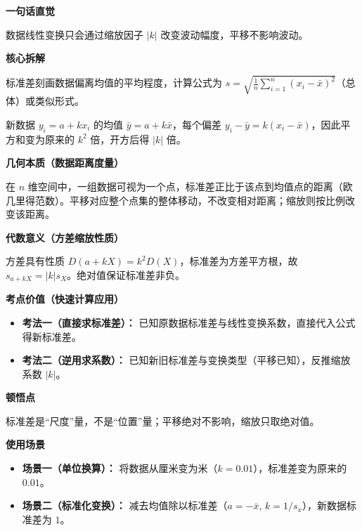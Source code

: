 \begin{explanationbox}

	\textbf{\textcolor{CExplanation}{一句话直觉}}

	数据线性变换只会通过缩放因子 $|k|$ 改变波动幅度，平移不影响波动。

	\medskip
	\textbf{\textcolor{CExplanation}{核心拆解}}
	\begin{description}[style=nextline, leftmargin=2.8em, labelsep=0.5em, itemsep=0.45em]
		\item[\textbf{要点一（标准差的定义）：}] 标准差刻画数据偏离均值的平均程度，计算公式为 $s = \sqrt{\frac{1}{n}\sum_{i=1}^n (x_i - \bar{x})^2}$（总体）或类似形式。
		\item[\textbf{要点二（线性变换效应）：}] 新数据 $y_i = a + kx_i$ 的均值 $\bar{y} = a + k\bar{x}$，每个偏差 $y_i - \bar{y} = k(x_i - \bar{x})$，因此平方和变为原来的 $k^2$ 倍，开方后得 $|k|$ 倍。
	\end{description}

	\medskip
	\textbf{\textcolor{CExplanation}{几何本质（数据距离度量）}}

	在 $n$ 维空间中，一组数据可视为一个点，标准差正比于该点到均值点的距离（欧几里得范数）。平移对应整个点集的整体移动，不改变相对距离；缩放则按比例改变该距离。

	\medskip
	\textbf{\textcolor{CExplanation}{代数意义（方差缩放性质）}}

	方差具有性质 $D(a + kX) = k^2 D(X)$，标准差为方差平方根，故 $s_{a+kX} = |k| s_X$。绝对值保证标准差非负。

	\medskip
	\textbf{\textcolor{CExplanation}{考点价值（快速计算应用）}}
	\begin{itemize}[leftmargin=*, itemsep=0.5em, topsep=0.4em]
		\item \textbf{考法一（直接求标准差）：} 已知原数据标准差与线性变换系数，直接代入公式得新标准差。
		\item \textbf{考法二（逆用求系数）：} 已知新旧标准差与变换类型（平移已知），反推缩放系数 $|k|$。
	\end{itemize}

	\medskip
	\textbf{\textcolor{CExplanation}{顿悟点}}

	标准差是“尺度”量，不是“位置”量；平移绝对不影响，缩放只取绝对值。

	\medskip
	\textbf{\textcolor{CExplanation}{使用场景}}
	\begin{itemize}[leftmargin=*, itemsep=0.5em, topsep=0.4em]
		\item \textbf{场景一（单位换算）：} 将数据从厘米变为米（$k = 0.01$），标准差变为原来的 $0.01$。
		\item \textbf{场景二（标准化变换）：} 减去均值除以标准差（$a = -\bar{x}$, $k = 1/s_x$），新数据标准差为 $1$。
	\end{itemize}
\end{explanationbox}
